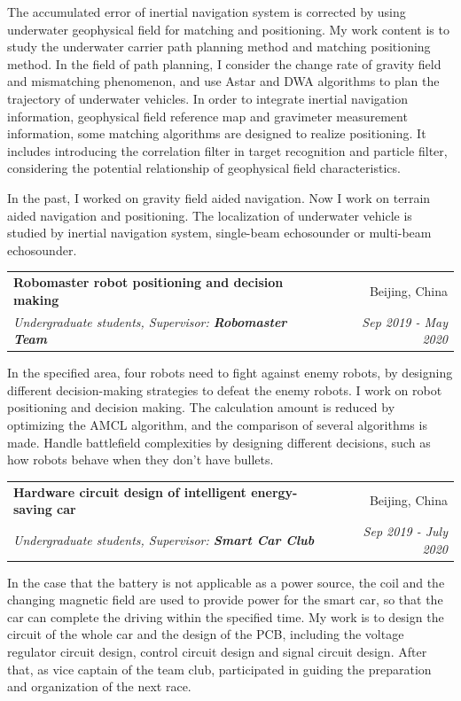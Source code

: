 \documentclass[letterpaper,10pt]{article}
\makeatletter
\newcommand{\resumeSubheading}[4]{
  \vspace{-1pt}\item[]
  \begin{tabular*}{0.98\textwidth}{l@{\extracolsep{\fill}}r}
      \hspace{-10pt}\textbf{#1} & #2 \\
      \hspace{-10pt}\textit{\small#3} & \textit{\small #4} \\
    \end{tabular*}\vspace{-5pt}
}
\makeatother
\begin{document}
      {The accumulated error of inertial navigation system is corrected by using underwater geophysical field for matching and positioning. My work content is to study the underwater carrier path planning method and matching positioning method. In the field of path planning, I consider the change rate of gravity field and mismatching phenomenon, and use Astar and DWA algorithms to plan the trajectory of underwater vehicles. In order to integrate inertial navigation information, geophysical field reference map and gravimeter measurement information, some matching algorithms are designed to realize positioning. It includes introducing the correlation filter in target recognition and particle filter, considering the potential relationship of geophysical field characteristics. 
      	
      In the past, I worked on gravity field aided navigation. Now I work on terrain aided navigation and positioning. The localization of underwater vehicle is studied by inertial navigation system, single-beam echosounder or multi-beam echosounder.
      }
  
      \resumeSubheading
  		{Robomaster robot positioning and decision making}{Beijing, China}
 		{Undergraduate students, Supervisor: \textbf{Robomaster Team}}{Sep 2019 - May 2020}
 		
 		{In the specified area, four robots need to fight against enemy robots, by designing different decision-making strategies to defeat the enemy robots. I work on robot positioning and decision making. The calculation amount is reduced by optimizing the AMCL algorithm, and the comparison of several algorithms is made. Handle battlefield complexities by designing different decisions, such as how robots behave when they don't have bullets.}
 		
 		\resumeSubheading
 		{Hardware circuit design of intelligent energy-saving car}{Beijing, China}
 		{Undergraduate students, Supervisor: \textbf{Smart Car Club}}{Sep 2019 - July 2020}
 		
 		{In the case that the battery is not applicable as a power source, the coil and the changing magnetic field are used to provide power for the smart car, so that the car can complete the driving within the specified time. My work is to design the circuit of the whole car and the design of the PCB, including the voltage regulator circuit design, control circuit design and signal circuit design. After that, as vice captain of the team club, participated in guiding the preparation and organization of the next race.}
  
\end{document}
